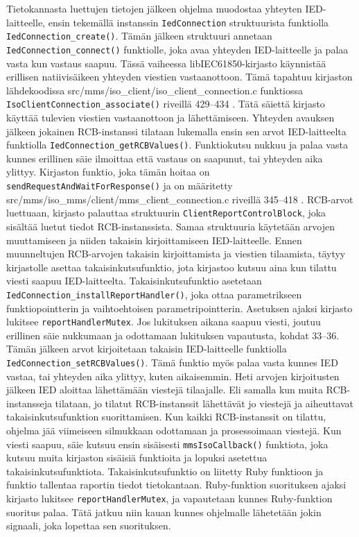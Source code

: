 Tietokannasta luettujen tietojen jälkeen ohjelma muodostaa yhteyten IED-laitteelle, ensin tekemällä instanssin \texttt{IedConnection} struktuurista funktiolla \texttt{IedConnection\_create()}. Tämän jälkeen struktuuri annetaan \texttt{IedConnection\_connect()} funktiolle, joka avaa yhteyden IED-laitteelle ja palaa vasta kun vastaus saapuu. Tässä vaiheessa libIEC61850-kirjasto käynnistää erillisen natiivisäikeen yhteyden viestien vastaanottoon. Tämä tapahtuu kirjaston lähdekoodissa src/mms/iso\_client/iso\_client\_connection.c funktiossa \texttt{IsoClientConnection\_associate()} riveillä 429--434 \cite{libIEC61850-repo}. Tätä säiettä kirjasto käyttää tulevien viestien vastaanottoon ja lähettämiseen. Yhteyden avauksen jälkeen jokainen RCB-instanssi tilataan lukemalla ensin sen arvot IED-laitteelta funktiolla \texttt{IedConnection\_getRCBValues()}. Funktiokutsu nukkuu ja palaa vasta kunnes erillinen säie ilmoittaa että vastaus on saapunut, tai yhteyden aika ylittyy. Kirjaston funktio, joka tämän hoitaa on \texttt{sendRequestAndWaitForResponse()} ja on määritetty src/mms/iso\_mms/client/mms\_client\_connection.c riveillä 345--418 \cite{libIEC61850-repo}. RCB-arvot luettuaan, kirjasto palauttaa struktuurin \texttt{ClientReportControlBlock}, joka sisältää luetut tiedot RCB-instanssista. Samaa struktuuria käytetään arvojen muuttamiseen ja niiden takaisin kirjoittamiseen IED-laitteelle. Ennen muunneltujen RCB-arvojen takaisin kirjoittamista ja viestien tilaamista, täytyy kirjastolle asettaa takaisinkutsufunktio, jota kirjastoo kutsuu aina kun tilattu viesti saapuu IED-laitteelta. Takaisinkutsufunktio asetetaan \texttt{IedConnection\_installReportHandler()}, joka ottaa parametrikseen funktiopointterin ja vaihtoehtoisen parametripointterin. Asetuksen ajaksi kirjasto lukitsee \texttt{reportHandlerMutex}. Jos lukituksen aikana saapuu viesti, joutuu erillinen säie nukkumaan ja odottamaan lukituksen vapautusta, kohdat 33--36. Tämän jälkeen arvot kirjoitetaan takaisin IED-laitteelle funktiolla \texttt{IedConnection\_setRCBValues()}. Tämä funktio myös palaa vasta kunnes IED vastaa, tai yhteyden aika ylittyy, kuten aikaisemmin. Heti arvojen kirjoitusten jälkeen IED aloittaa lähettämään viestejä tilaajalle. Eli samalla kun muita RCB-instansseja tilataan, jo tilatut RCB-instanssit lähettävät jo viestejä ja aiheuttavat takaisinkutsufunktion suorittamisen. Kun kaikki RCB-instanssit on tilattu, ohjelma jää viimeiseen silmukkaan odottamaan ja prosessoimaan viestejä. Kun viesti saapuu, säie kutsuu ensin sisäisesti \texttt{mmsIsoCallback()} funktiota, joka kutsuu muita kirjaston sisäisiä funktioita ja lopuksi asetettua takaisinkutsufunktiota. Takaisinkutsufunktio on liitetty Ruby funktioon ja funktio tallentaa raportin tiedot tietokantaan. Ruby-funktion suorituksen ajaksi kirjasto lukitsee \texttt{reportHandlerMutex}, ja vapautetaan kunnes Ruby-funktion suoritus palaa. Tätä jatkuu niin kauan kunnes ohjelmalle lähetetään jokin signaali, joka lopettaa sen suorituksen. \cite{Kozlovski2017, Storimer2013}

